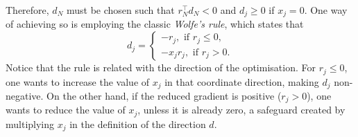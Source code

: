 Therefore, $d_N$ must be chosen such that $r_N^\top d_N < 0$ and $d_j \geq 0$ if $x_j = 0$. One way of achieving so is employing the classic \emph{Wolfe's rule}, which states that
$$d_j = \begin{cases} -r_j, \text{ if } r_j \leq 0, \\
                      -x_jr_j, \text{ if } r_j > 0.
        \end{cases}
$$ 
Notice that the rule is related with the direction of the optimisation. For $r_j \leq 0$, one wants to increase the value of $x_j$ in that coordinate direction, making $d_j$ non-negative. On the other hand, if the reduced gradient is positive ($r_j > 0$), one wants to reduce the value of $x_j$, unless it is already zero, a safeguard created by multiplying $x_j$ in the definition of the direction $d$.

